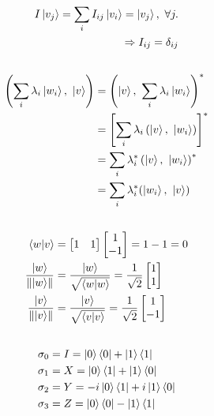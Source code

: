 \subsection{}
\begin{align}
	I\ket{v_j} = \sum_i I_{ij} \ket{v_i} = \ket{v_j},\ \forall j.\\
	\Rightarrow I_{ij} = \delta_{ij}
\end{align}

\setcounter{subsection}{5}
\subsection{}
\begin{align}
	\left(\sum_i \lambda_i \ket{w_i},\ \ket{v}\right) &=
	\left(\ket{v},\ \sum_i \lambda_i \ket{w_i}\right)^*\\
	&= \left[\sum_i \lambda_i \left(\ket{v},\ \ket{w_i}  \right) \right]^*\\
	&= \sum_i \lambda_i^* \left(\ket{v},\ \ket{w_i} \right)^*\\
	&= \sum_i \lambda_i^* (\ket{w_i},\ \ket{v})
\end{align}


\subsection{}
\begin{align}
	\braket{w | v} &= \begin{bmatrix}
		1 & 1
	\end{bmatrix} 
	\begin{bmatrix}
	1 \\ 
	-1
	\end{bmatrix} 
	= 1 - 1 = 0\\
%	
	\frac{\ket{w}}{\norm{\ket{w}}} &= 
	\frac{\ket{w}}{\sqrt{\braket{w|w}}} = \frac{1}{\sqrt{2}} \begin{bmatrix}
	1 \\ 
	1
	\end{bmatrix}\\
%	
	\frac{\ket{v}}{\norm{\ket{v}}} &= 
	\frac{\ket{v}}{\sqrt{\braket{v|v}}} = \frac{1}{\sqrt{2}} \begin{bmatrix}
	1 \\ 
	-1
	\end{bmatrix}
\end{align}


\setcounter{subsection}{8}
\subsection{}
\begin{align}
	\sigma_0 &= I = \ket{0}\bra{0} + \ket{1}\bra{1}\\
	\sigma_1 &= X = \ket{0}\bra{1} + \ket{1}\bra{0}\\
	\sigma_2 &= Y = -i\ket{0}\bra{1} + i\ket{1}\bra{0}\\
	\sigma_3 &= Z = \ket{0}\bra{0} - \ket{1}\bra{1}
\end{align}



